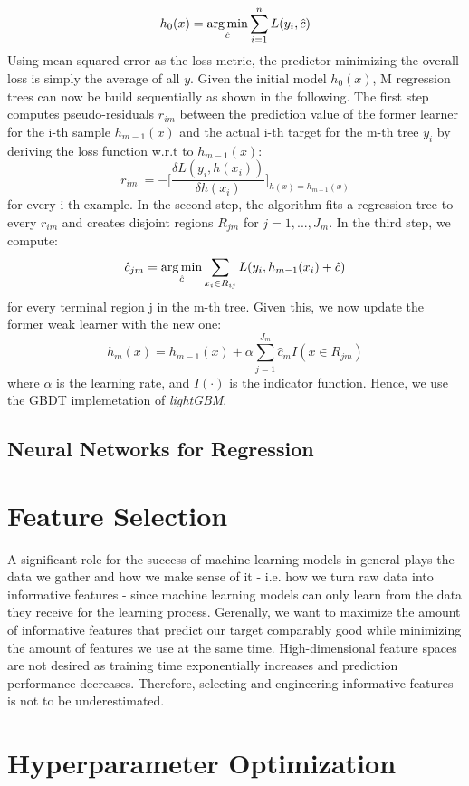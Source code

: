 \begin{equation}
h_{0}(x) =  \operatorname*{arg\,min}_{\hat{c}} \sum_{i=1}^n L(y_i,\hat{c}) \label{gbdt_step1}
\end{equation}
Using mean squared error as the loss metric, the predictor minimizing the overall loss is simply the average of all $ y $.
Given the initial model $ h_0(x) $, M regression trees can now be build sequentially as shown in the following. 
The first step computes pseudo-residuals $ r_{im} $ between the prediction value of the former learner for the i-th sample $ h_{m-1}(x) $ and the actual i-th target for the m-th tree $ y_i $ by deriving the loss function w.r.t to $ h_{m-1}(x) $: 
\begin{equation}
	r_{im}\ = - \bigg[\dfrac{\delta L(y_i, h(x_i))}{\delta h(x_i)}\bigg]_{h(x) = h_{m-1}(x)}
\end{equation} 
for every i-th example.
In the second step, the algorithm fits a regression tree to every $ r_{im} $ and creates disjoint regions $ R_{jm} $ for $j = 1, ..., J_m$. 
In the third step, we compute: 
\begin{equation}
	\hat{c}_{jm} = \operatorname*{arg\,min}_{\hat{c}} \sum_{x_i \in R_{ij}} L(y_i, h_{m-1}(x_i) + \hat{c})
\end{equation}
for every terminal region j in the m-th tree. 
Given this, we now update the former weak learner with the new one:
\begin{equation}
	h_m(x) = h_{m-1}(x) + \alpha \sum_{j=1}^{J_m} \hat{c}_{m}I(x \in R_{jm})
\end{equation}
where $ \alpha $ is the learning rate, and $ I(\cdot) $ is the indicator function.
Hence, we use the GBDT implemetation of \textit{lightGBM}.



\subsection{Neural Networks for Regression}\label{sec:nn}


\section{Feature Selection}

A significant role for the success of machine learning models in general plays the data we gather and how we make sense of it - i.e. how we turn raw data into informative features - since machine learning models can only learn from the data they receive for the learning process. Gerenally, we want to maximize the amount of informative features that predict our target comparably good while minimizing the amount of features we use at the same time. High-dimensional feature spaces are not desired as training time exponentially increases and prediction performance decreases.
Therefore, selecting and engineering informative features is not to be underestimated. 

\section{Hyperparameter Optimization}


